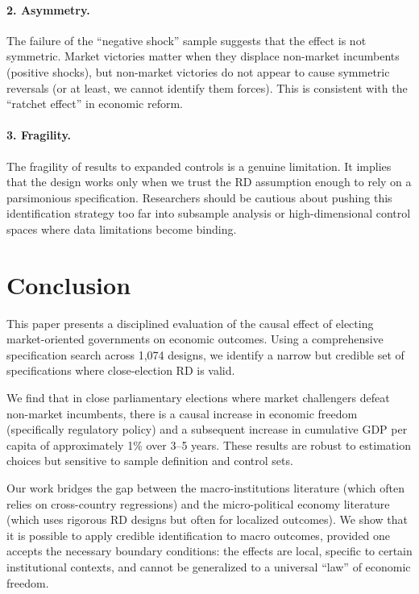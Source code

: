 \documentclass[12pt,a4paper]{article}
\begin{document}
\paragraph{2. Asymmetry.}
The failure of the ``negative shock'' sample suggests that the effect 
is not symmetric. Market victories matter when they displace non-market 
incumbents (positive shocks), but non-market victories do not appear 
to cause symmetric reversals (or at least, we cannot identify them forces). 
This is consistent with the ``ratchet effect'' in economic reform.

\paragraph{3. Fragility.}
The fragility of results to expanded controls is a genuine limitation. 
It implies that the design works only when we trust the RD assumption 
enough to rely on a parsimonious specification. Researchers should be 
cautious about pushing this identification strategy too far into 
subsample analysis or high-dimensional control spaces where data limitations 
become binding.


\section{Conclusion}
\label{sec:conclusion}

This paper presents a disciplined evaluation of the causal effect of 
electing market-oriented governments on economic outcomes. Using a 
comprehensive specification search across 1,074 designs, we identify a narrow 
but credible set of specifications where close-election RD is valid.

We find that in close parliamentary elections where market challengers 
defeat non-market incumbents, there is a causal increase in economic 
freedom (specifically regulatory policy) and a subsequent increase in 
cumulative GDP per capita of approximately 1\% over 3--5 years. These 
results are robust to estimation choices but sensitive to sample definition 
and control sets.

Our work bridges the gap between the macro-institutions literature (which 
often relies on cross-country regressions) and the micro-political economy 
literature (which uses rigorous RD designs but often for localized outcomes). 
We show that it is possible to apply credible identification to macro 
outcomes, provided one accepts the necessary boundary conditions: the effects 
are local, specific to certain institutional contexts, and cannot be 
generalized to a universal ``law'' of economic freedom.
\end{document}
